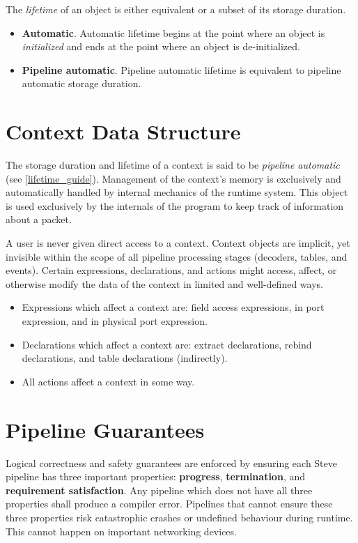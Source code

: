 The \textit{lifetime} of an object is either equivalent or a subset of its storage duration.

\begin{itemize}
\item \textbf{Automatic}. Automatic lifetime begins at the point where an object is \textit{initialized} and ends at the point where an object is de-initialized.
\item \textbf{Pipeline automatic}. Pipeline automatic lifetime is equivalent to pipeline automatic storage duration.
\end{itemize}

\section{Context Data Structure} \label{context_guide}

The storage duration and lifetime of a context is said to be \textit{pipeline automatic} (see \ref{lifetime_guide}). Management of the context's memory is exclusively and automatically handled by internal mechanics of the runtime system. This object is used exclusively by the internals of the program to keep track of information about a packet.

A user is never given direct access to a context. Context objects are implicit, yet invisible within the scope of all pipeline processing stages (decoders, tables, and events). Certain expressions, declarations, and actions might access, affect, or otherwise modify the data of the context in limited and well-defined ways.
\begin{itemize}
\item Expressions which affect a context are: field access expressions, in port expression, and in physical port expression.

\item Declarations which affect a context are: extract declarations, rebind declarations, and table declarations (indirectly).

\item All actions affect a context in some way.
\end{itemize}

\section{Pipeline Guarantees} \label{pipeline_checking_guide}

Logical correctness and safety guarantees are enforced by ensuring each Steve pipeline has three important properties: \textbf{progress}, \textbf{termination}, and \textbf{requirement satisfaction}. Any pipeline which does not have all three properties shall produce a compiler error. Pipelines that cannot ensure these three properties risk catastrophic crashes or undefined behaviour during runtime. This cannot happen on important networking devices.

